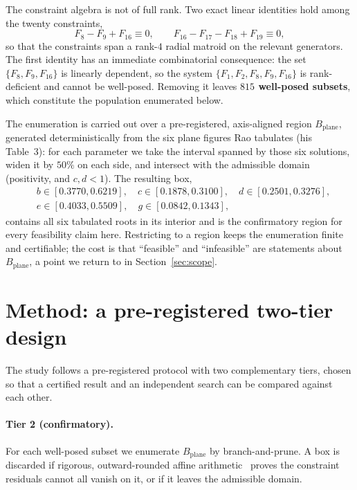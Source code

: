 \documentclass[11pt]{article}
\newcommand{\Bplane}{B_{\mathrm{plane}}}
\begin{document}
The constraint algebra is not of full rank. Two exact linear identities hold among the twenty constraints,
\begin{equation}
F_8 - F_9 + F_{16} \equiv 0,
\qquad
F_{16} - F_{17} - F_{18} + F_{19} \equiv 0,
\label{eq:identities}
\end{equation}
so that the constraints span a rank-$4$ radial matroid on the relevant generators.
The first identity has an immediate combinatorial consequence: the set $\{F_8,F_9,F_{16}\}$ is linearly dependent, so the system $\{F_1,F_2,F_8,F_9,F_{16}\}$ is rank-deficient and cannot be well-posed. Removing it leaves \textbf{$815$ well-posed subsets}, which constitute the population enumerated below.

The enumeration is carried out over a pre-registered, axis-aligned region $\Bplane$, generated deterministically from the six plane figures Rao tabulates (his Table~3): for each parameter we take the interval spanned by those six solutions, widen it by $50\%$ on each side, and intersect with the admissible domain (positivity, and $c,d<1$). The resulting box,
\begin{equation*}
\begin{aligned}
&b\in[0.3770,0.6219],\quad c\in[0.1878,0.3100],\quad d\in[0.2501,0.3276],\\
&e\in[0.4033,0.5509],\quad g\in[0.0842,0.1343],
\end{aligned}
\end{equation*}
contains all six tabulated roots in its interior and is the confirmatory region for every feasibility claim here. Restricting to a region keeps the enumeration finite and certifiable; the cost is that ``feasible'' and ``infeasible'' are statements about $\Bplane$, a point we return to in Section~\ref{sec:scope}.

\section{Method: a pre-registered two-tier design}
\label{sec:method}

The study follows a pre-registered protocol with two complementary tiers, chosen so that a certified result and an independent search can be compared against each other.

\paragraph{Tier 2 (confirmatory).}
For each well-posed subset we enumerate $\Bplane$ by branch-and-prune. A box is discarded if rigorous, outward-rounded affine arithmetic~\cite{Stolfi2004} proves the constraint residuals cannot all vanish on it, or if it leaves the admissible domain.
\end{document}
